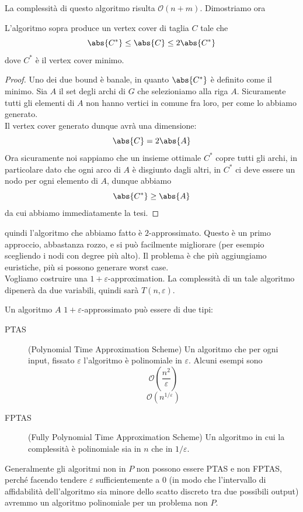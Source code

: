 \documentclass[11pt]{scrartcl}
\newcommand{\bigo}{\mathcal{O}}
\begin{document}
	La complessità di questo algoritmo risulta $\bigo(n+m)$. Dimostriamo ora
	\begin{lemma}[Correctness]
		L'algoritmo sopra produce un vertex cover di taglia $C$ tale che
		$$\abs{C^*}\le \abs{C}\le 2\abs{C^*}$$
		dove $C^*$ è il vertex cover minimo.
	\end{lemma}
	\begin{proof}
		Uno dei due bound è banale, in quanto $\abs{C^*}$ è definito come il minimo.
		Sia $A$ il set degli archi di $G$ che selezioniamo alla riga $A$. Sicuramente tutti gli elementi di $A$ non hanno vertici in comune fra loro, per come lo abbiamo generato. \\
		Il vertex cover generato dunque avrà una dimensione:
		$$\abs{C}=2\abs{A}$$
		Ora sicuramente noi sappiamo che un insieme ottimale $C^*$ copre tutti gli archi, in particolare dato che ogni arco di $A$ è disgiunto dagli altri, in $C^*$ ci deve essere un nodo per ogni elemento di $A$, dunque abbiamo
		$$\abs{C^*}\ge \abs{A}$$
		da cui abbiamo immediatamente la tesi.
	\end{proof}
	quindi l'algoritmo che abbiamo fatto è $2$-approssimato. Questo è un primo approccio, abbastanza rozzo, e si può facilmente migliorare (per esempio scegliendo i nodi con degree più alto). Il problema è che più aggiungiamo euristiche, più si possono generare worst case. \\
	Vogliamo costruire una $1+\varepsilon$-approximation. La complessità di un tale algoritmo dipenerà da due variabili, quindi sarà $T(n,\varepsilon)$. 
	\begin{definition}
		Un algoritmo $A$ $1+\varepsilon$-approssimato può essere di due tipi:
		\begin{description}
			\item[PTAS] (Polynomial Time Approximation Scheme) Un algoritmo che per ogni input, fissato $\varepsilon$ l'algoritmo è polinomiale in $\varepsilon$. Alcuni esempi sono
			$$\bigo\left(\frac{n^2}{\varepsilon}\right)$$
			$$\bigo\left(n^{1/\varepsilon}\right)$$
			\item[FPTAS] (Fully Polynomial Time Approximation Scheme) Un algoritmo in cui la complessità è polinomiale sia in $n$ che in $1/\varepsilon$.
		\end{description}
	\end{definition}
	Generalmente gli algoritmi non in $P$ non possono essere PTAS e non FPTAS, perché facendo tendere $\varepsilon$ sufficientemente a $0$ (in modo che l'intervallo di affidabilità dell'algoritmo sia minore dello scatto discreto tra due possibili output) avremmo un algoritmo polinomiale per un problema non $P$. 
	
\end{document}
